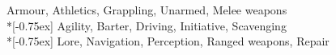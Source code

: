 
{\footnotesize
{} Armour, Athletics, Grappling, Unarmed, Melee weapons \\*[-0.75ex]
 Agility, Barter, Driving, Initiative, Scavenging \\*[-0.75ex]
 Lore, Navigation, Perception, Ranged weapons, Repair}
